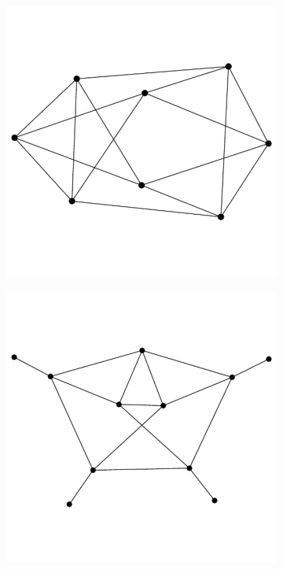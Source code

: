 \documentclass[12pt,a4paper]{article}
\renewcommand{\|}{\rule[-0.4ex]{0.2ex}{1.2em}}
\begin{document}
\begin{figure}[htb]
	\begin{subfigure}[b]{.24 \textwidth}
		\includegraphics[width=\linewidth]{graph_comp}
		\subcaption{}
	\end{subfigure}
	\begin{subfigure}[b]{.24 \textwidth}
		\includegraphics[width=\linewidth]{graph_dec1}

\end{subfigure}
\end{figure}
\end{document}
